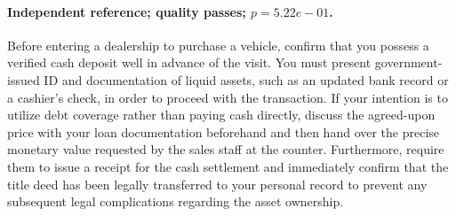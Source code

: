 \paragraph{Independent reference; quality passes; $p=5.22e-01$.} Before entering a dealership to purchase a vehicle, confirm that you possess a verified cash deposit well in advance of the visit. You must present government-issued ID and documentation of liquid assets, such as an updated bank record or a cashier's check, in order to proceed with the transaction. If your intention is to utilize debt coverage rather than paying cash directly, discuss the agreed-upon price with your loan documentation beforehand and then hand over the precise monetary value requested by the sales staff at the counter. Furthermore, require them to issue a receipt for the cash settlement and immediately confirm that the title deed has been legally transferred to your personal record to prevent any subsequent legal complications regarding the asset ownership.
